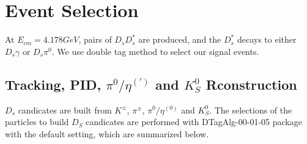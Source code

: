 \section{Event Selection}
\label{ST-selection}
At $E_{cm} = 4.178 GeV$, pairs of $D_{s}D_{s}^{*}$ are produced,  and the $D_{s}^{*}$ decays to either $D_{s}\gamma$ or $D_{s}\pi^{0}$.  We use double tag method to select our signal events.


\subsection{Tracking, PID, $\pi^{0}/\eta^{(')}$ and $K_{S}^{0}$ Rconstruction }
$D_{s}$ candicates are built from $K^{\pm}$, $\pi^{\pm}$, $\pi^{0}/\eta^{(0)}$ and $K_{S}^{0}$. The selections of the particles to build $D_{S}$ candicates are performed with DTagAlg-00-01-05 package with the default setting, which are summarized below.

